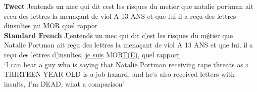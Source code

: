 \begin{exe}
\ex 
\gll
\textbf{Tweet} 
Jentends un mec qui dit cest les risques du metier que natalie portman ait recu des lettres la menaçant de viol A 13 ANS et que lui il a reçu des lettres dinsultes jui MOR quel rappor
\\
\textbf{Standard French} 
J\underline{'}entends un mec qui dit c\underline{'}est les risques du m\underline{é}tier que Natalie Portman ait re\underline{ç}u des lettres la menaçant de viol A 13 ANS et que lui, il a reçu des lettres d\underline{'}insultes, \underline{je suis} MOR\underline{T(E)}, quel rappor\underline{t}
 \\
\trans `I can hear a guy who is saying that Natalie Portman receiving rape threats as a THIRTEEN YEAR OLD is a job hazard, and he's also received letters with insults, I'm DEAD, what a comparison'
\end{exe}



